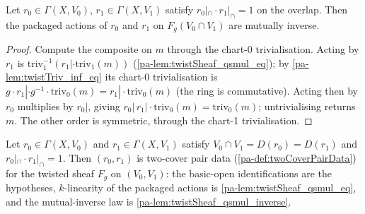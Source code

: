 \begin{lemma}
  \label{pa-lem:twistSheaf_qsmul_inverse}
  \leanok

  Let \(r_0 \in \Gamma(X, V_0)\), \(r_1 \in \Gamma(X, V_1)\) satisfy
  \(r_0|_{\cap} \cdot r_1|_{\cap} = 1\) on the overlap. Then the packaged actions of
  \(r_0\) and \(r_1\) on \(F_g(V_0 \cap V_1)\) are mutually inverse.
\end{lemma}
\begin{proof}
  \leanok
  Compute the composite on \(m\) through the chart-0 trivialisation. Acting by \(r_1\)
  is \(\mathrm{triv}_1^{-1}(r_1| \cdot \mathrm{triv}_1(m))\)
  (\ref{pa-lem:twistSheaf_qsmul_eq}); by \ref{pa-lem:twistTriv_inf_eq} its chart-0
  trivialisation is \(g \cdot r_1| \cdot g^{-1} \cdot \mathrm{triv}_0(m)
  = r_1| \cdot \mathrm{triv}_0(m)\) (the ring is commutative). Acting then by \(r_0\)
  multiplies by \(r_0|\), giving \(r_0|\, r_1| \cdot \mathrm{triv}_0(m) =
  \mathrm{triv}_0(m)\); untrivialising returns \(m\). The other order is symmetric,
  through the chart-1 trivialisation.
\end{proof}

\begin{definition}
  \label{pa-def:twistPairData}
  \leanok

  Let \(r_0 \in \Gamma(X, V_0)\) and \(r_1 \in \Gamma(X, V_1)\) satisfy
  \(V_0 \cap V_1 = D(r_0) = D(r_1)\) and \(r_0|_{\cap} \cdot r_1|_{\cap} = 1\). Then
  \((r_0, r_1)\) is two-cover pair data (\ref{pa-def:twoCoverPairData}) for the twisted
  sheaf \(F_g\) on \((V_0, V_1)\): the basic-open identifications are the hypotheses,
  \(k\)-linearity of the packaged actions is \ref{pa-lem:twistSheaf_qsmul_eq}, and the
  mutual-inverse law is \ref{pa-lem:twistSheaf_qsmul_inverse}.
\end{definition}

